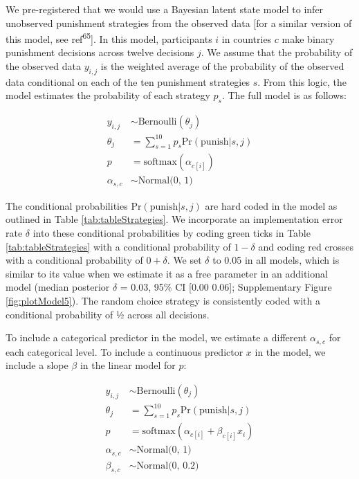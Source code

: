 \documentclass[
  english,
  man, donotrepeattitle,floatsintext]{apa6}
\begin{document}
We pre-registered that we would use a Bayesian latent state model to infer
unobserved punishment strategies from the observed data {[}for a similar version
of this model, see ref\textsuperscript{65}{]}. In this model, participants \(i\) in
countries \(c\) make binary punishment decisions across twelve decisions \(j\). We
assume that the probability of the observed data \(y_{i,j}\) is the weighted
average of the probability of the observed data conditional on each of the ten
punishment strategies \(s\). From this logic, the model estimates the probability
of each strategy \(p_{s}\). The full model is as follows:

\begin{align}
y_{i,j} &\sim \text{Bernoulli}(\theta_{j}) \\
\theta_{j} &= \sum_{s=1}^{10} p_{s} \text{Pr}(\text{punish}|s,j) \nonumber \\
p &= \text{softmax}(\alpha_{c[i]}) \nonumber \\
\alpha_{s,c} &\sim \text{Normal(0, 1)} \nonumber
\end{align}

The conditional probabilities \(\text{Pr}(\text{punish}|s,j)\) are hard coded in
the model as outlined in Table \ref{tab:tableStrategies}. We incorporate an
implementation error rate \(\delta\) into these conditional probabilities by coding
green ticks in Table \ref{tab:tableStrategies} with a conditional probability
of \(1 - \delta\) and coding red crosses with a conditional probability of
\(0 + \delta\). We set \(\delta\) to 0.05 in all models, which is similar to its
value when we estimate it as a free parameter in an additional model (median
posterior \(\delta\) = 0.03, 95\% CI
{[}0.00 0.06{]};
Supplementary Figure \ref{fig:plotModel5}). The random choice strategy is
consistently coded with a conditional probability of ½ across all decisions.

To include a categorical predictor in the model, we estimate a different
\(\alpha_{s,c}\) for each categorical level. To include a continuous predictor
\(x\) in the model, we include a slope \(\beta\) in the linear model for \(p\):

\begin{align}
y_{i,j} &\sim \text{Bernoulli}(\theta_{j}) \\
\theta_{j} &= \sum_{s=1}^{10} p_{s} \text{Pr}(\text{punish}|s,j) \nonumber \\
p &= \text{softmax}(\alpha_{c[i]} + \beta_{c[i]}x_{i}) \nonumber \\
\alpha_{s,c} &\sim \text{Normal(0, 1)} \nonumber \\
\beta_{s,c} &\sim \text{Normal(0, 0.2)} \nonumber
\end{align}
\end{document}
